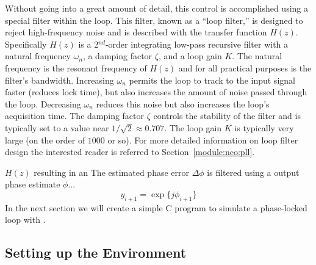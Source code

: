 Without going into a great amount of detail, this control is
accomplished using a special filter within the loop.
This filter, known as a ``loop filter,'' is designed to reject
high-frequency noise and is described with the transfer function $H(z)$.
Specifically $H(z)$ is a 2$^{nd}$-order integrating low-pass recursive
filter with
a natural frequency $\omega_n$,
a damping factor $\zeta$, and
a loop gain $K$.
The natural frequency is the resonant frequency of $H(z)$ and for all
practical purposes is the filter's bandwidth.
Increasing $\omega_n$ permits the loop to track to the input signal
faster (reduces lock time), but also increases the amount of noise
passed through the loop.
Decreasing $\omega_n$ reduces this noise but also increases the loop's
acquisition time.
The damping factor $\zeta$ controls the stability of the filter and is
typically set to a value near $1/\sqrt{2} \approx 0.707$.
The loop gain $K$ is typically very large
(on the order of $1000$ or so).
For more detailed information on loop filter design the interested
reader is referred to Section~\ref{module:nco:pll}.


$H(z)$ resulting in an
The estimated phase error $\Delta\phi$ is filtered using a
output phase estimate $\phi$...
%
\begin{equation}
\label{eqn:tutoral:pll:y1}
    y_{i+1} = \exp\bigl\{ j\phi_{i+1} \bigr\}
\end{equation}
%
%
%
%
%
In the next section we will create a simple C program to simulate a
phase-locked loop with \liquid.


\subsection{Setting up the Environment}
\label{tutorial:pll:environment}

